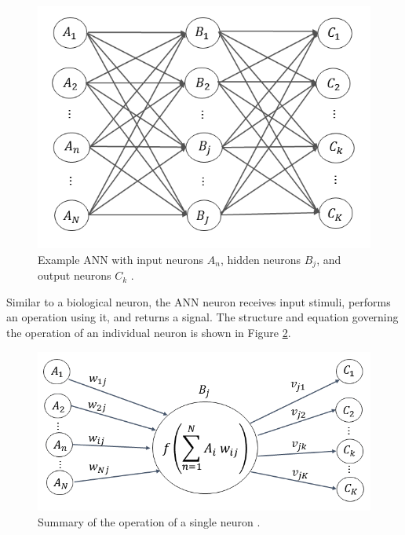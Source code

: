 \begin{figure}[H]
\centering
\includegraphics[width=0.75\linewidth]{images/Network}
\caption{Example ANN with input neurons $A_n$, hidden neurons $B_j$, and output neurons $C_k$ \cite{kamuda2017}.}
\label{fig:Network}
\end{figure}


Similar to a biological neuron, the ANN neuron receives input stimuli, performs an operation using it, and returns a signal. The structure and equation governing the operation of an individual neuron is shown in Figure \ref{fig:Node}. 

\begin{figure}[H]
	\centering
	\includegraphics[width=0.75\linewidth]{images/Node_ABC_2}
	\caption{Summary of the operation of a single neuron \cite{kamuda2017}.}
	\label{fig:Node}
\end{figure}

